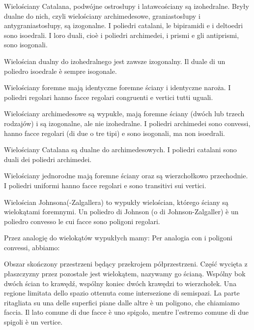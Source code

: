 \begin{example}
    Wielościany Catalana, podwójne ostrosłupy i latawcościany są izohedralne. Bryły dualne do nich, czyli wielościany archimedesowe, graniastosłupy i antygraniastosłupy, są izogonalne. %
    I poliedri catalani, le bipiramidi e i deltoedri sono isoedrali. I loro duali, cioè i poliedri archimedei, i prismi e gli antiprismi, sono isogonali. %
\end{example}

Wielościan dualny do izohedralnego jest zawsze izogonalny. %
Il duale di un poliedro isoedrale è sempre isogonale. %

Wielościany foremne mają identyczne foremne ściany i identyczne naroża. %
I poliedri regolari hanno facce regolari congruenti e vertici tutti uguali. %

Wielościany archimedesowe są wypukłe, mają foremne ściany (dwóch lub trzech rodzajów) i są izogonalne, ale nie izohedralne. %
I poliedri archimedei sono convessi, hanno facce regolari (di due o tre tipi) e sono isogonali, ma non isoedrali. %

Wielościany Catalana są dualne do archimedesowych. %
I poliedri catalani sono duali dei poliedri archimedei. %

Wielościany jednorodne mają foremne ściany oraz są wierzchołkowo przechodnie. %
I poliedri uniformi hanno facce regolari e sono transitivi sui vertici. %

Wielościan Johnsona(-Zalgallera) to wypukły wielościan, którego ściany są wielokątami foremnymi. %
Un poliedro di Johnson (o di Johnson-Zalgaller) è un poliedro convesso le cui facce sono poligoni regolari. %

Przez analogię do wielokątów wypukłych mamy: %
Per analogia con i poligoni convessi, abbiamo: %

\begin{definition}
[wielościan wypukły] %
[poliedro convesso] %
    Obszar skończony przestrzeni będący przekrojem półprzestrzeni. %
    Część wycięta z płaszczyzny przez pozostałe jest wielokątem, nazywamy go ścianą. %
    Wspólny bok dwóch ścian to krawędź, wspólny koniec dwóch krawędzi to wierzchołek. %
    Una regione limitata dello spazio ottenuta come intersezione di semispazi. %
    La parte ritagliata su una delle superfici piane dalle altre è un poligono, che chiamiamo faccia. %
    Il lato comune di due facce è uno spigolo, mentre l'estremo comune di due spigoli è un vertice. %
\end{definition}

